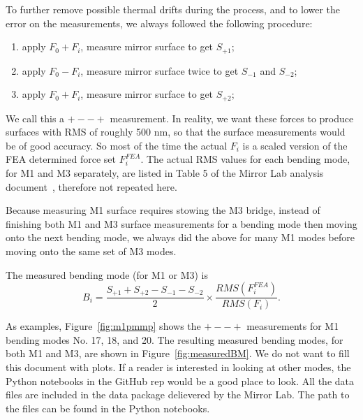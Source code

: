 \documentclass [twoside,openbib,12pt]{article}
\newcommand{\beq}{\begin{equation}}
\newcommand{\eeq}{\end{equation}}
\newcommand{\bnum}{\begin{enumerate}}
\newcommand{\enum}{\end{enumerate}}
\begin{document}
To further remove possible thermal drifts during the process, and to
lower the error on the measurements, we always followed the following
procedure:
\bnum
\item apply $F_0+F_i$, measure mirror surface to get $S_{+1}$;
  \item apply $F_0-F_i$, measure mirror surface twice to get $S_{-1}$ and
    $S_{-2}$;
    \item apply $F_0+F_i$, measure mirror surface to get $S_{+2}$;
      \enum
      We call this a $+--+$ measurement.
      In reality, we want these forces to produce surfaces with RMS of
      roughly 500 nm, so that the surface measurements would be of
      good accuracy. So most of the time the actual $F_i$ is a scaled
      version of the FEA determined force set $F_i^{FEA}$. The actual
      RMS values for each bending mode, for M1 and M3 separately, are
      listed in Table 5 of the Mirror Lab analysis document~\cite{m1m3UAreport},
      therefore not repeated here.

Because measuring M1 surface requires stowing the M3 bridge, instead
of finishing both M1 and M3 surface measurements for a bending mode
then moving onto the next bending mode, we always did the above for many
M1 modes before moving onto the same set of M3 modes.

      The measured bending mode (for M1 or M3) is
      \beq
      B_i = \frac{S_{+1} + S_{+2} - S_{-1} - S_{-2}}{2} \times
      \frac{RMS(F_i^{FEA})}{RMS(F_i)}.
      \eeq

 As examples, Figure~\ref{fig:m1pmmp} shows the $+--+$ measurements
 for M1 bending modes No. 17, 18, and 20.
 The resulting measured bending modes, for both M1 and M3, are shown
 in Figure~\ref{fig:measuredBM}.
 We do not want to fill this document with plots. If a reader is
 interested in looking at other modes, the Python notebooks in the
 GitHub rep would be a good place to look. All the data files are
 included in the data package delievered by the Mirror Lab. The path
 to the files can be found in the Python notebooks.
      
\end{document}
